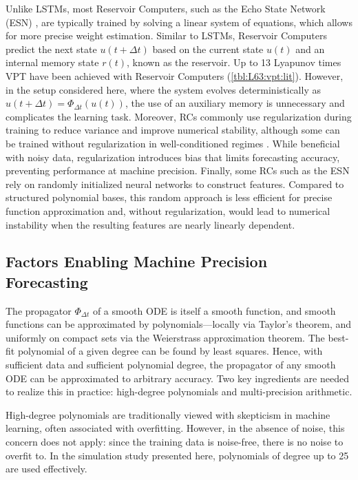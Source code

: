 \documentclass{article}
\newcommand{\stepsize}{\Delta\!t}
\begin{document}
Unlike LSTMs, most Reservoir Computers, such as the Echo State Network (ESN) \citep{jaeger2001echo}, are typically trained by solving a linear system of equations, which allows for more precise weight estimation. Similar to LSTMs, Reservoir Computers predict the next state $u(t+\stepsize)$ based on the current state $u(t)$ and an internal memory state $r(t)$, known as the reservoir. Up to 13 Lyapunov times VPT have been achieved with Reservoir Computers (\cref{tbl:L63:vpt:lit}). However, in the setup considered here, where the system evolves deterministically as $u(t+\stepsize)=\Phi_{\stepsize}(u(t))$, the use of an auxiliary memory is unnecessary and complicates the learning task.
Moreover, RCs commonly use regularization during training to reduce variance and improve numerical stability, although some can be trained without regularization in well-conditioned regimes \citep{Santos2025}. While beneficial with noisy data, regularization introduces bias that limits forecasting accuracy, preventing performance at machine precision.
Finally, some RCs such as the ESN rely on randomly initialized neural networks to construct features. Compared to structured polynomial bases, this random approach is less efficient for precise function approximation and, without regularization, would lead to numerical instability when the resulting features are nearly linearly dependent.

\subsection{Factors Enabling Machine Precision Forecasting}\label{ssec:enabling_factors}

The propagator $\Phi_{\stepsize}$ of a smooth ODE is itself a smooth function, and smooth functions can be approximated by polynomials---locally via Taylor's theorem, and uniformly on compact sets via the Weierstrass approximation theorem. The best-fit polynomial of a given degree can be found by least squares. Hence, with sufficient data and sufficient polynomial degree, the propagator of any smooth ODE can be approximated to arbitrary accuracy. Two key ingredients are needed to realize this in practice: high-degree polynomials and multi-precision arithmetic.

High-degree polynomials are traditionally viewed with skepticism in machine learning, often associated with overfitting. However, in the absence of noise, this concern does not apply: since the training data is noise-free, there is no noise to overfit to. In the simulation study presented here, polynomials of degree up to 25 are used effectively.
\end{document}
